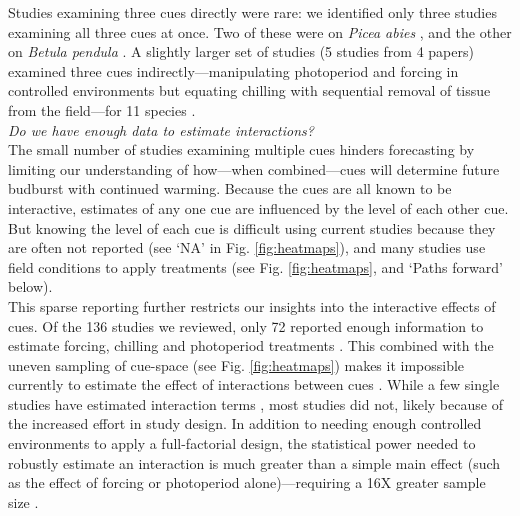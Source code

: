 \documentclass[11pt,letter]{article}
\begin{document}
Studies examining three cues directly were rare: we identified only three studies examining all three cues at once. Two of these were on \emph{Picea abies} \citep{Worrall:1967aa,Sogaard:2008aa}, and the other on \emph{Betula pendula} \citep{Skuterud:1994aa}. A slightly larger set of studies (5 studies from 4 papers) examined three cues indirectly---manipulating photoperiod and forcing in controlled environments but equating chilling with sequential removal of tissue from the field---for 11 species \citep{Schnabel:1987aa,Heide:1993,Partanen:1998aa,Basler:2014aa}. \\

\emph{Do we have enough data to estimate interactions?}\\
The small number of studies examining multiple cues hinders forecasting by limiting our understanding of how---when combined---cues will determine future budburst with continued warming. Because the cues are all known to be interactive, estimates of any one cue are influenced by the level of each other cue. But knowing the level of each cue is difficult using current studies because they are often not reported (see `NA' in Fig. \ref{fig:heatmaps}), and many studies use field conditions to apply treatments (see Fig. \ref{fig:heatmaps}, and `Paths forward' below).\\

This sparse reporting further restricts our insights into the interactive effects of cues. Of the 136 studies we reviewed, only 72 reported enough information to estimate forcing, chilling and photoperiod treatments \citep{ettinger2020}. This combined with the uneven sampling of cue-space (see Fig. \ref{fig:heatmaps}) makes it impossible currently to estimate the effect of interactions between cues \citep{ettinger2020}. While a few single studies have estimated interaction terms \citep[e.g.,][]{zohner2014,flynn2018}, most studies did not, likely because of the increased effort in study design. In addition to needing enough controlled environments to apply a full-factorial design, the statistical power needed to robustly estimate an interaction is much greater than a simple main effect (such as the effect of forcing or photoperiod alone)---requiring a 16X greater sample size \citep{regotherstories}.\\ 
\end{document}
